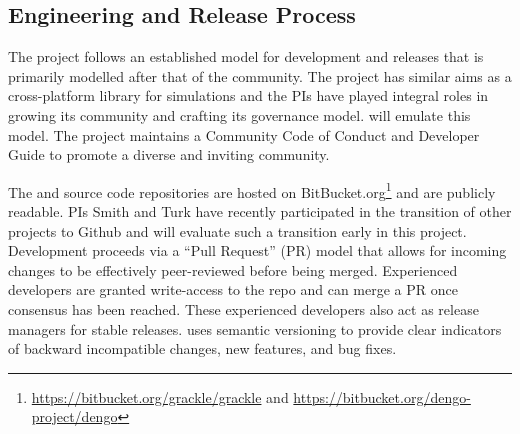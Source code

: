 \subsection{Engineering and Release Process}

The \grackle{} project follows an established model for development
and releases that is primarily modelled after that of the \yt{}
community.  The \yt{} project has similar aims as a cross-platform
library for simulations and the PIs have played integral roles in
growing  its community and crafting its governance model.
\dengo{} will emulate this model. The \grackle{}
project maintains a Community Code of Conduct and Developer Guide
to promote a diverse and inviting community.

The \grackle{} and \dengo{}
source code repositories are hosted on
BitBucket.org\footnote{\url{https://bitbucket.org/grackle/grackle} and
\url{https://bitbucket.org/dengo-project/dengo}} and are publicly
readable. PIs Smith and Turk have recently participated in the
transition of other projects to Github and will evaluate such a
transition early in this project. Development proceeds via a ``Pull Request''
(PR) model that allows for incoming changes to be effectively
peer-reviewed before being merged.
Experienced developers are granted write-access to the repo and can
merge a PR once consensus has been reached.
These experienced developers also act as release managers for stable
releases. \grackle{} uses semantic versioning to provide clear
indicators of backward incompatible changes, new features, and bug fixes.


